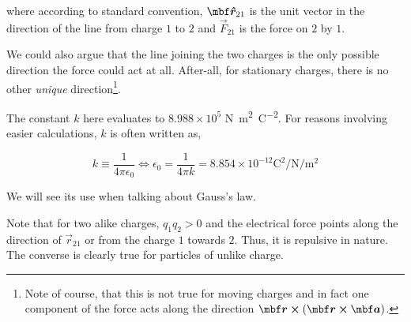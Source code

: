 where according to standard convention, \(\unitv{r}_{21}\) is the unit vector 
in the direction of the line from charge \(1\) to \(2\) and \(\vec{F}_{21}\) is 
the force on \(2\) by \(1\).

We could also argue that the line joining the two charges is the only possible direction 
the force could act at all. After-all, for stationary charges, there is no other 
\emph{unique} direction\footnote{Note of course, that this is not true for 
moving charges and in fact one component of the force acts along the direction 
\(\vec{r} \cp (\vec{r} \cp \vec{a})\).}.

The constant \(k\) here evaluates to \(8.988 \times 10^5\) \unit{\newton\meter\squared\per\coulomb\squared}.
For reasons involving easier calculations, \(k\) is often written as,

\begin{equation}
    k \equiv \frac{1}{4\pi\epsilon_0} \iff \boxed{\epsilon_0 = \frac{1}{4\pi k} = 8.854 \times 10^{-12} \unit{\coulomb\squared\per\newton\per\meter\squared}}
\end{equation}

We will see its use when talking about Gauss's law.

Note that for two alike charges, \(q_1q_2 > 0\) and the electrical force points along the direction of 
\(\vec{r}_{21}\) or from the charge \(1\) towards \(2\). Thus, it is repulsive 
in nature. The converse is clearly true for particles of unlike charge.